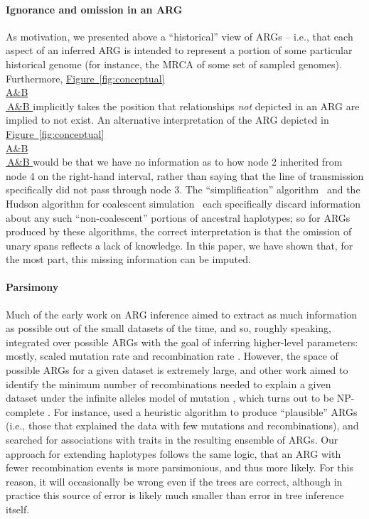 \documentclass[10pt,twoside,lineno]{gsajnl}
\newcommand*{\figref}[2][]{%
	\hyperref[{#2}]{%
		Figure~\ref*{#2}%
		\ifx\\#1\\%
		\else
		\,#1%
		\fi
	}%
}
\begin{document}
\paragraph{Ignorance and omission in an ARG}
As motivation, we presented above a ``historical'' view of ARGs --
i.e., that each aspect of an inferred ARG is intended to represent
a portion of some particular historical genome
(for instance, the MRCA of some set of sampled genomes).
Furthermore, \figref[A\&B]{fig:conceptual} implicitly takes the position
that relationships \emph{not} depicted in an ARG are implied to not exist.
An alternative interpretation
of the ARG depicted in \figref[A\&B]{fig:conceptual} would be that we have no information as to 
how node 2 inherited from node 4 on the right-hand interval,
rather than saying that the line of transmission specifically did not pass
through node 3.
The ``simplification'' algorithm~\citep{kelleher2018efficient}
and the Hudson algorithm for coalescent
simulation~\citep{hudson1983properties,kelleher2016efficient}
each specifically discard information about any such ``non-coalescent'' portions of ancestral haplotypes;
so for ARGs produced by these algorithms, the correct interpretation is that
the omission of unary spans reflects a lack of knowledge.
In this paper, we have shown that, for the most part, this missing information can be imputed.

\paragraph{Parsimony}
Much of the early work on ARG inference aimed to extract as much information as possible
out of the small datasets of the time,
and so, roughly speaking, integrated over possible ARGs
with the goal of inferring higher-level parameters:
mostly, scaled mutation rate and recombination rate
\citep[e.g.,][]{hudson1985statistical,griffiths1996ancestral,kuhner2000maximum,stephens2000inference,fearnhead2001estimating}.
However, the space of possible ARGs for a given dataset is extremely large,
and other work aimed to identify the minimum number of recombinations
needed to explain a given dataset under the infinite alleles model of mutation
\citep[e.g.,][]{hein1990reconstructing,myers2003bounds,song2005constructing},
which turns out to be NP-complete \citep{wang2001perfect}.
For instance, \citet{minichiello2006mapping}
used a heuristic algorithm to produce ``plausible'' ARGs
(i.e., those that explained the data with few mutations and recombinations),
and searched for associations with traits in the resulting ensemble of ARGs.
Our approach for extending haplotypes follows the same logic,
that an ARG with fewer recombination events is more parsimonious,
and thus more likely.
For this reason, it will occasionally be wrong even if the trees are correct,
although in practice this source of error is likely much smaller than error in tree inference itself.
\end{document}

